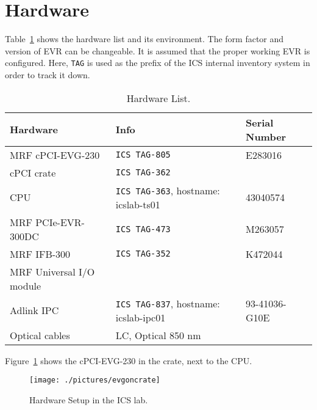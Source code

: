 \documentclass[11pt
  , a4paper
  , article
  , oneside
  , showtrims
]{memoir}
\begin{document}
\section{Hardware}
Table~\ref{table:hwlist} shows the hardware list and its environment. The form factor and version of EVR can be changeable. It is assumed that the proper working EVR is configured. Here, \texttt{TAG} is used as the prefix of the ICS internal inventory system in order to track it down.
\begin{table}[!hb]
  \centering
  \begin{tabular}{l|l|l}
    \toprule
    Hardware                 & Info                                         & Serial Number \\\midrule
    MRF cPCI-EVG-230         & \texttt{ICS TAG-805}                         & E283016       \\\midrule
    cPCI crate               & \texttt{ICS TAG-362}                         &               \\\midrule
    CPU                      & \texttt{ICS TAG-363}, hostname: icslab-ts01  & 43040574      \\\midrule
    MRF PCIe-EVR-300DC       & \texttt{ICS TAG-473}                         & M263057       \\\midrule
    MRF IFB-300              & \texttt{ICS TAG-352}                         & K472044       \\\midrule
    MRF Universal I/O module &                                              &               \\\midrule
    Adlink IPC               & \texttt{ICS TAG-837}, hostname: icslab-ipc01 & 93-41036-G10E \\\midrule
    Optical cables           & LC, Optical 850 nm                           &               \\\bottomrule
  \end{tabular}
  \caption[]{Hardware List.}
  \label{table:hwlist}
\end{table}


Figure~\ref{fig:hw-setup} shows the cPCI-EVG-230 in the crate, next to the CPU.
\begin{figure}[!b]
  \centering
  \texttt{[image: ./pictures/evgoncrate]}
  \caption{Hardware Setup in the ICS lab.}
  \label{fig:hw-setup}
\end{figure}


\clearpage
\end{document}
